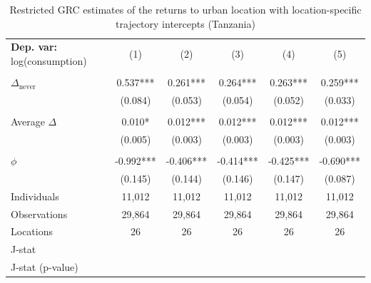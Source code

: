 \begin{table}[htbp] \centering \begin{threeparttable}
 \caption{Restricted GRC estimates of the returns to urban location with location-specific trajectory intercepts (Tanzania)} 
 \label{tab:verdier_robust_onestep_TZA_consumption_urban_unb} 
\begin{tabular}{l ccccc} \toprule  \textbf{Dep. var:}  log(consumption) 
                    &\multicolumn{1}{c}{(1)}   &\multicolumn{1}{c}{(2)}   &\multicolumn{1}{c}{(3)}   &\multicolumn{1}{c}{(4)}   &\multicolumn{1}{c}{(5)}   \\
                    &               &               &               &               &               \\
\addlinespace
$\Delta_{\text{never}}$&       0.537***&       0.261***&       0.264***&       0.263***&       0.259***\\
                    &     (0.084)   &     (0.053)   &     (0.054)   &     (0.052)   &     (0.033)   \\
                    &               &               &               &               &               \\
\addlinespace
Average $\Delta$    &       0.010*  &       0.012***&       0.012***&       0.012***&       0.012***\\
                    &     (0.005)   &     (0.003)   &     (0.003)   &     (0.003)   &     (0.003)   \\
                    &               &               &               &               &               \\
\addlinespace
$\phi$              &      -0.992***&      -0.406***&      -0.414***&      -0.425***&      -0.690***\\
                    &     (0.145)   &     (0.144)   &     (0.146)   &     (0.147)   &     (0.087)   \\
\addlinespace
Individuals         &      11,012   &      11,012   &      11,012   &      11,012   &      11,012   \\
Observations        &      29,864   &      29,864   &      29,864   &      29,864   &      29,864   \\
Locations           &          26   &          26   &          26   &          26   &          26   \\
J-stat              &               &               &               &               &               \\
J-stat (p-value)    &               &               &               &               &               \\

\end{tabular}
\end{threeparttable}
\end{table}
